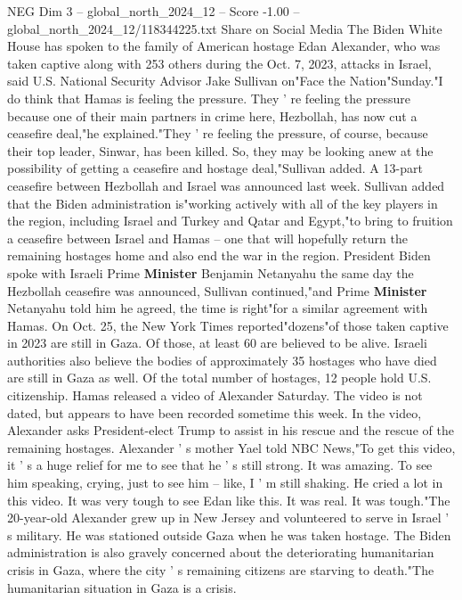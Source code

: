 \begin{textsample}{NEG Dim 3 – global\_north\_2024\_12 – Score -1.00 – global\_north\_2024\_12/118344225.txt}  \label{ex:f3_neg_224}
Share on Social Media The Biden White House has spoken to the family of American hostage Edan Alexander, who was taken captive along with 253 others during the Oct. 7, 2023, attacks in Israel, said U.S.
National Security Advisor Jake Sullivan on"Face the Nation"Sunday."I do think that Hamas is feeling the pressure.
They ' re feeling the pressure because one of their main partners in crime here, Hezbollah, has now cut a ceasefire deal,"he explained."They ' re feeling the pressure, of course, because their top leader, Sinwar, has been killed.
So, they may be looking anew at the possibility of getting a ceasefire and hostage deal,"Sullivan added.
A 13-part ceasefire between Hezbollah and Israel was announced last week.
Sullivan added that the Biden administration is"working actively with all of the key players in the region, including Israel and Turkey and Qatar and Egypt,"to bring to fruition a ceasefire between Israel and Hamas -- one that will hopefully return the remaining hostages home and also end the war in the region.
President Biden spoke with Israeli Prime \textbf{Minister} Benjamin Netanyahu the same day the Hezbollah ceasefire was announced, Sullivan continued,"and Prime \textbf{Minister} Netanyahu told him he agreed, the time is right"for a similar agreement with Hamas.
On Oct. 25, the New York Times reported"dozens"of those taken captive in 2023 are still in Gaza.
Of those, at least 60 are believed to be alive.
Israeli authorities also believe the bodies of approximately 35 hostages who have died are still in Gaza as well.
Of the total number of hostages, 12 people hold U.S. citizenship.
Hamas released a video of Alexander Saturday.
The video is not dated, but appears to have been recorded sometime this week.
In the video, Alexander asks President-elect Trump to assist in his rescue and the rescue of the remaining hostages.
Alexander ' s mother Yael told NBC News,"To get this video, it ' s a huge relief for me to see that he ' s still strong.
It was amazing.
To see him speaking, crying, just to see him -- like, I ' m still shaking.
He cried a lot in this video.
It was very tough to see Edan like this.
It was real.
It was tough."The 20-year-old Alexander grew up in New Jersey and volunteered to serve in Israel ' s military.
He was stationed outside Gaza when he was taken hostage.
The Biden administration is also gravely concerned about the deteriorating humanitarian crisis in Gaza, where the city ' s remaining citizens are starving to death."The humanitarian situation in Gaza is a crisis.

\end{textsample}
